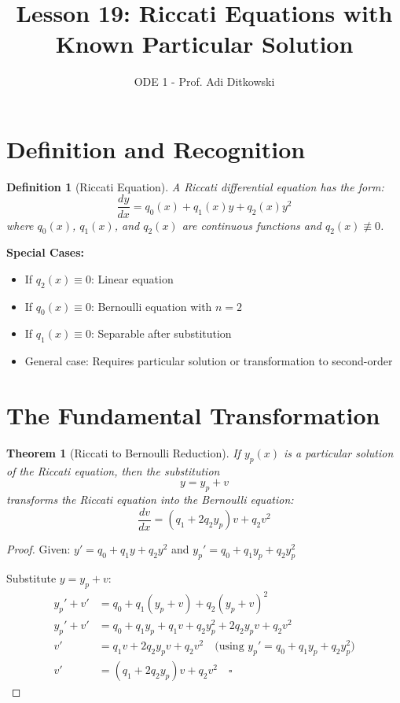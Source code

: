 \documentclass[12pt]{article}
\title{Lesson 19: Riccati Equations with Known Particular Solution}
\author{ODE 1 - Prof. Adi Ditkowski}
\date{}
\newtheorem{definition}{Definition}
\newtheorem{theorem}{Theorem}
\begin{document}
\maketitle

\section{Definition and Recognition}

\begin{definition}[Riccati Equation]
A Riccati differential equation has the form:
$$\frac{dy}{dx} = q_0(x) + q_1(x)y + q_2(x)y^2$$
where $q_0(x)$, $q_1(x)$, and $q_2(x)$ are continuous functions and $q_2(x) \not\equiv 0$.
\end{definition}

\begin{keypoint}
\textbf{Special Cases:}
\begin{itemize}
    \item If $q_2(x) \equiv 0$: Linear equation
    \item If $q_0(x) \equiv 0$: Bernoulli equation with $n = 2$
    \item If $q_1(x) \equiv 0$: Separable after substitution
    \item General case: Requires particular solution or transformation to second-order
\end{itemize}
\end{keypoint}

\section{The Fundamental Transformation}

\begin{theorem}[Riccati to Bernoulli Reduction]
If $y_p(x)$ is a particular solution of the Riccati equation, then the substitution
$$y = y_p + v$$
transforms the Riccati equation into the Bernoulli equation:
$$\frac{dv}{dx} = (q_1 + 2q_2y_p)v + q_2v^2$$
\end{theorem}

\begin{proof}
Given: $y' = q_0 + q_1y + q_2y^2$ and $y_p' = q_0 + q_1y_p + q_2y_p^2$

Substitute $y = y_p + v$:
\begin{align}
y_p' + v' &= q_0 + q_1(y_p + v) + q_2(y_p + v)^2 \\
y_p' + v' &= q_0 + q_1y_p + q_1v + q_2y_p^2 + 2q_2y_pv + q_2v^2 \\
v' &= q_1v + 2q_2y_pv + q_2v^2 \quad \text{(using } y_p' = q_0 + q_1y_p + q_2y_p^2\text{)} \\
v' &= (q_1 + 2q_2y_p)v + q_2v^2 \quad \square
\end{align}
\end{proof}
\end{document}
